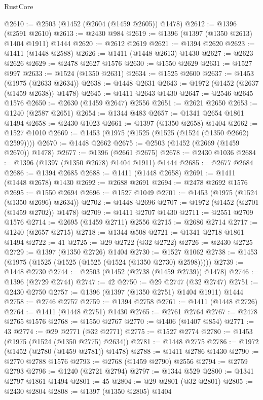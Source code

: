 \begin{lexlean}{RustCore}
\begin{coremodule}
@2610 := @2503 (@1452 (@2604 (@1459 @2605)) @1478)
@2612 := @1396 (@2591 @2610)
@2613 := @2430 @984
@2619 := @1396 (@1397 (@1350 @2613) @1404 @1911) @1444
@2620 := @2612 @2619
@2621 := @1394 @2620
@2623 := @1411 (@1448 @2588)
@2626 := @1411 (@1448 @2613) @1430
@2627 := @2623 @2626
@2629 := @2478 @2627 @1576
@2630 := @1550 @2629
@2631 := @1527 @997
@2633 := @1524 (@1350 @2631)
@2634 := @1525 @2600
@2637 := @1453 (@1975 (@2633 @2634))
@2638 := @1448 @2631
@2643 := @1972 (@1452 (@2637 (@1459 @2638)) @1478)
@2645 := @1411 @2643 @1430
@2647 := @2546 @2645 @1576
@2650 := @2630 (@1459 @2647) @2556
@2651 := @2621 @2650
@2653 := @1240 (@2587 @2651)
@2654 := @1344 @483
@2657 := @1341 @2654 @1861 @1494
@2658 := @2430 @1023
@2661 := @1397 (@1350 @2658) @1404
@2662 := @1527 @1010
@2669 := @1453 (@1975 (@1525 (@1525 (@1524 (@1350 @2662) @2599))))
@2670 := @1448 @2662
@2675 := @2503 (@1452 (@2669 (@1459 @2670)) @1478)
@2677 := @1396 (@2661 @2675)
@2678 := @2430 @1036
@2684 := @1396 (@1397 (@1350 @2678) @1404 @1911) @1444
@2685 := @2677 @2684
@2686 := @1394 @2685
@2688 := @1411 (@1448 @2658)
@2691 := @1411 (@1448 @2678) @1430
@2692 := @2688 @2691
@2694 := @2478 @2692 @1576
@2695 := @1550 @2694
@2696 := @1527 @1049
@2701 := @1453 (@1975 (@1524 (@1350 @2696) @2634))
@2702 := @1448 @2696
@2707 := @1972 (@1452 (@2701 (@1459 @2702)) @1478)
@2709 := @1411 @2707 @1430
@2711 := @2551 @2709 @1576
@2714 := @2695 (@1459 @2711) @2556
@2715 := @2686 @2714
@2717 := @1240 (@2657 @2715)
@2718 := @1344 @508
@2721 := @1341 @2718 @1861 @1494
@2722 := 41
@2725 := @29 @2722 (@32 @2722)
@2726 := @2430 @2725
@2729 := @1397 (@1350 @2726) @1404
@2730 := @1527 @1062
@2738 := @1453 (@1975 (@1525 (@1525 (@1525 (@1524 (@1350 @2730) @2598)))))
@2739 := @1448 @2730
@2744 := @2503 (@1452 (@2738 (@1459 @2739)) @1478)
@2746 := @1396 (@2729 @2744)
@2747 := 42
@2750 := @29 @2747 (@32 @2747)
@2751 := @2430 @2750
@2757 := @1396 (@1397 (@1350 @2751) @1404 @1911) @1444
@2758 := @2746 @2757
@2759 := @1394 @2758
@2761 := @1411 (@1448 @2726)
@2764 := @1411 (@1448 @2751) @1430
@2765 := @2761 @2764
@2767 := @2478 @2765 @1576
@2768 := @1550 @2767
@2770 := @1406 (@1407 @854)
@2771 := 43
@2774 := @29 @2771 (@32 @2771)
@2775 := @1527 @2774
@2780 := @1453 (@1975 (@1524 (@1350 @2775) @2634))
@2781 := @1448 @2775
@2786 := @1972 (@1452 (@2780 (@1459 @2781)) @1478)
@2788 := @1411 @2786 @1430
@2790 := @2770 @2788 @1576
@2793 := @2768 (@1459 @2790) @2556
@2794 := @2759 @2793
@2796 := @1240 (@2721 @2794)
@2797 := @1344 @529
@2800 := @1341 @2797 @1861 @1494
@2801 := 45
@2804 := @29 @2801 (@32 @2801)
@2805 := @2430 @2804
@2808 := @1397 (@1350 @2805) @1404

\end{coremodule}
\end{lexlean}
